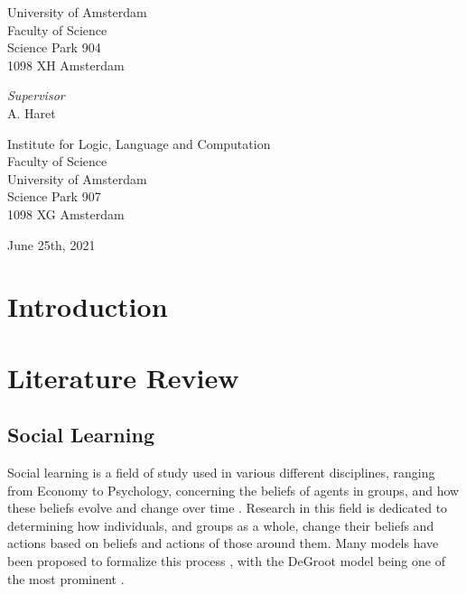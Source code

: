 \documentclass[a4paper, 12pt]{report}
\newcommand{\theSupervisor}{A. Haret} %
\newcommand{\theInstitute}{
Institute for Logic, Language and Computation\\ %
Faculty of Science\\
University of Amsterdam\\
Science Park 907 \\ %
1098 XG Amsterdam %
}
\newcommand{\theDate}{June 25th, 2021}
\begin{document}
\begin{center}
University of Amsterdam\\
Faculty of Science\\
Science Park 904\\
1098 XH Amsterdam

\vspace{2cm}

\emph{Supervisor}\\

\theSupervisor

\vspace{0.25cm}

\theInstitute

\vspace{1.0cm}

\theDate

\end{center}
\newpage

\thispagestyle{empty}

\tableofcontents

\thispagestyle{empty}

\newpage

\setcounter{page}{1}


\chapter{Introduction}

\chapter{Literature Review}
\section{Social Learning}
Social learning is a field of study used in various different disciplines, ranging from Economy to Psychology, concerning the beliefs of agents in groups, and how these beliefs evolve and change over time \parencite{reed2010sociallearning}. Research in this field is dedicated to determining how individuals, and groups as a whole, change their beliefs and actions based on beliefs and actions of those around them. Many models have been proposed to formalize this process \parencite{golub2017learning}, with the DeGroot model being one of the most prominent \parencite{degroot1974concensus}.
\end{document}
